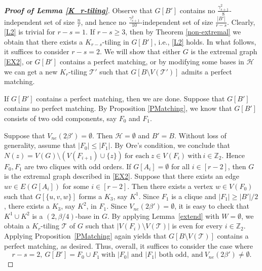\documentclass[11pt, a4paper]{article}
\theoremstyle{definition}
\newcommand{\<}{\subseteq}
\begin{document}
\begin{proof}[\bf Proof of Lemma \ref{K_r-tiling}]
Observe that $G[B']$ contains no $\frac{\gamma_{s+1}^2}{8}$-independent set of size $\frac{n}{r}$, and hence no $\frac{\gamma_{s+1}^2}{10}$-independent set of size $\frac{|B'|}{r-s}$. Clearly, \ref{L2} is trivial for $r-s=1$. If $r-s\geq 3$, then by Theorem \ref{non-extremal} we obtain that there exists a $K_{r-s}$-tiling in $G[B']$, i.e., \ref{L2} holds. %
In what follows, it suffices to consider $r-s=2$. We will show that either $G$ is the extremal graph \ref{EX2}, or $G[B']$ contains a perfect matching, or by modifying some bases in $\mathcal{H}$ we can get a new $K_r$-tiling $\mathcal{T}'$ such that $G[B\setminus V(\mathcal{T}')]$ admits a perfect matching. 

If $G[B']$ contains a perfect matching, then we are done. Suppose that $G[B']$ contains no perfect matching. By Proposition \ref{PMatching}, we know that $G[B']$ consists of two odd components, say $F_0$ and $F_1$.

Suppose that $V_{ne}(2\beta')= \emptyset$. Then   $\mathcal{H}=\emptyset$ and $B'=B$. Without loss of generality, assume that  $|F_0|\le |F_1|$. 
By Ore's condition, we conclude that 
$N(z)=V(G)\setminus (V(F_{i+1})\cup \{z\})\ \text{for each}\ z\in V(F_i)\ \text{with}\ i\in \mathbb{Z}_2.$ Hence %
$F_0, F_1$ are two cliques with odd orders. %
If $G[A_i]=\emptyset$ for all $i\in [r-2]$, then $G$ is the extremal graph described in \ref{EX2}. Suppose that there exists an edge $uv\in E(G[A_i])$ for some $i\in [r-2]$. Then there exists a vertex  $w\in V(F_0)$ such that $G[\{u,v,w\}]$ forms a $K_3$, say $K^1$. Since $F_1$ is a clique and $|F_1|\ge |B'|/2$, there exists a $K_3$, say $K^2$, in $F_1$. Since $V_{ne}(2\beta')=\emptyset$, it is easy to check that $K^1\cup K^2$ is a $(2,\beta/4)$-base in $G$. By applying Lemma~\ref{extend} with $W=\emptyset$, we obtain a $K_r$-tiling $\mathcal{T}$ of $G$ such that  $|V(F_i)\setminus V(\mathcal{T})|$ is even for every $i\in \mathbb{Z}_2$. Applying Proposition~\ref{PMatching} again yields that $G[B\setminus V(\mathcal{T})]$ contains a perfect matching, as desired. Thus, overall, it suffices to consider the case where 
$$
r-s=2,\ G[B']=F_0\cup F_1\ \text{with $|F_0|$ and $|F_1|$ both  odd} ,\ \text{and}\ V_{ne}(2\beta')\neq \emptyset.
$$


\end{proof}
\end{document}
